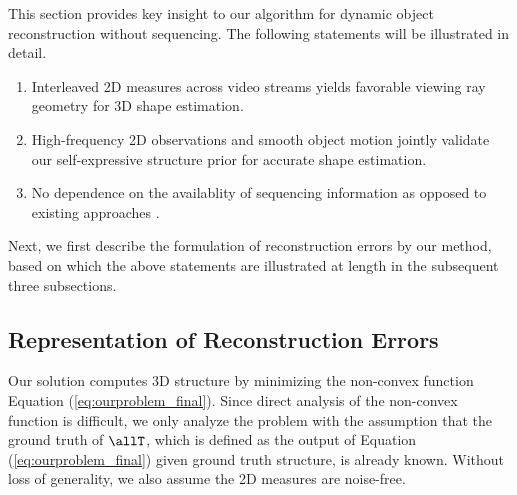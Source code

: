 This section provides key insight to our algorithm for dynamic object reconstruction without sequencing. %
The following statements will be illustrated in detail.
\begin{enumerate}
\item Interleaved 2D measures across video streams yields favorable viewing ray geometry for 3D shape estimation.
\item High-frequency 2D observations and smooth object motion jointly validate our self-expressive structure prior for accurate shape estimation.
\item No dependence on the availablity of sequencing information as opposed to existing approaches \cite{Park_ECCV2010,Valmadre_CVPR2012}.
\end{enumerate} 
Next, we first describe the formulation of reconstruction errors by our method, based on which the above statements are illustrated at length in the subsequent three subsections.

\subsection{Representation of Reconstruction Errors}
Our solution computes 3D structure by minimizing the non-convex function Equation (\ref{eq:ourproblem_final}).
Since direct analysis of the non-convex function is difficult, we only analyze the problem with the assumption that the ground truth of $\allT$, which is defined as the output of Equation (\ref{eq:ourproblem_final}) given ground truth structure, is already known. 
Without loss of generality, we also assume the 2D measures are noise-free.

